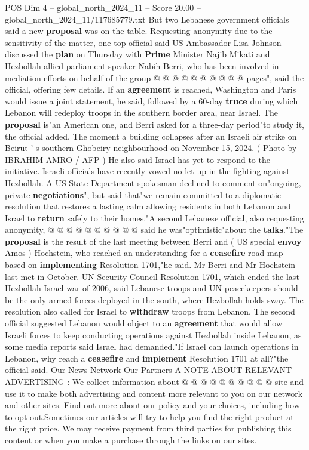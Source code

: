 \begin{textsample}{POS Dim 4 – global\_north\_2024\_11 – Score 20.00 – global\_north\_2024\_11/117685779.txt}
But two Lebanese government officials said a new \textbf{proposal} was on the table.
Requesting anonymity due to the sensitivity of the matter, one top official said US Ambassador Lisa Johnson discussed the \textbf{plan} on Thursday with \textbf{Prime} Minister Najib Mikati and Hezbollah-allied parliament speaker Nabih Berri, who has been involved in mediation efforts on behalf of the group @ @ @ @ @ @ @ @ @ @ pages", said the official, offering few details.
If an \textbf{agreement} is reached, Washington and Paris would issue a joint statement, he said, followed by a 60-day \textbf{truce} during which Lebanon will redeploy troops in the southern border area, near Israel.
The \textbf{proposal} is"an American one, and Berri asked for a three-day period"to study it, the official added.
The moment a building collapses after an Israeli air strike on Beirut ' s southern Ghobeiry neighbourhood on November 15, 2024. ( Photo by IBRAHIM AMRO / AFP ) He also said Israel has yet to respond to the initiative.
Israeli officials have recently vowed no let-up in the fighting against Hezbollah.
A US State Department spokesman declined to comment on"ongoing, private \textbf{negotiations}", but said that"we remain committed to a diplomatic resolution that restores a lasting calm allowing residents in both Lebanon and Israel to \textbf{return} safely to their homes."A second Lebanese official, also requesting anonymity, @ @ @ @ @ @ @ @ @ @ said he was"optimistic"about the \textbf{talks}."The \textbf{proposal} is the result of the last meeting between Berri and ( US special \textbf{envoy} Amos ) Hochstein, who reached an understanding for a \textbf{ceasefire} road map based on \textbf{implementing} Resolution 1701,"he said.
Mr Berri and Mr Hochstein last met in October.
UN Security Council Resolution 1701, which ended the last Hezbollah-Israel war of 2006, said Lebanese troops and UN peacekeepers should be the only armed forces deployed in the south, where Hezbollah holds sway.
The resolution also called for Israel to \textbf{withdraw} troops from Lebanon.
The second official suggested Lebanon would object to an \textbf{agreement} that would allow Israeli forces to keep conducting operations against Hezbollah inside Lebanon, as some media reports said Israel had demanded."If Israel can launch operations in Lebanon, why reach a \textbf{ceasefire} and \textbf{implement} Resolution 1701 at all?"the official said.
Our News Network Our Partners A NOTE ABOUT RELEVANT ADVERTISING : We collect information about @ @ @ @ @ @ @ @ @ @ site and use it to make both advertising and content more relevant to you on our network and other sites.
Find out more about our policy and your choices, including how to opt-out.Sometimes our articles will try to help you find the right product at the right price.
We may receive payment from third parties for publishing this content or when you make a purchase through the links on our sites.

\end{textsample}
